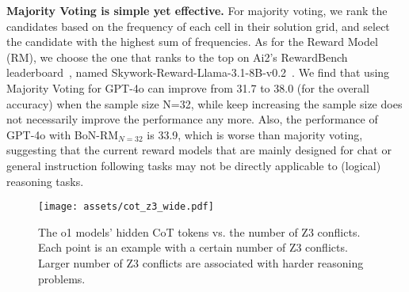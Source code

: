 \textbf{Majority Voting is simple yet effective.}
For majority voting, we rank the candidates based on the frequency of each cell in their solution grid, and select the candidate with the highest sum of frequencies. 
As for the Reward Model (RM), we choose the one that ranks to the top on Ai2's RewardBench leaderboard~\citep{Lambert2024RewardBenchER}, named Skywork-Reward-Llama-3.1-8B-v0.2~\citep{liu2024skywork}. 
We find that using Majority Voting for GPT-4o can improve from 31.7 to 38.0 (for the overall accuracy) when the sample size N=32, while keep increasing the sample size does not necessarily improve the performance any more. 
Also, the performance of GPT-4o with BoN-RM$_{N=32}$ is  33.9, which is worse than majority voting, suggesting that the current reward models that are mainly designed for chat or general instruction following tasks may not be directly applicable to (logical) reasoning tasks.





\begin{figure*}[t]
        \texttt{[image: assets/cot\_z3\_wide.pdf]}
        \caption{The o1 models' hidden CoT tokens vs. the number of Z3 conflicts. Each point is an example with a certain number of Z3 conflicts. Larger number of Z3 conflicts are associated with harder reasoning problems. 
        }
        \vspace{-1em}
        \label{fig:o1_preview_hidden_cot_z3}
\end{figure*}



